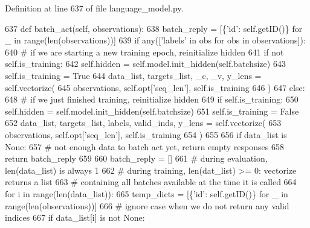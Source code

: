 Definition at line 637 of file language\+\_\+model.\+py.


\begin{DoxyCode}
637     \textcolor{keyword}{def }batch\_act(self, observations):
638         batch\_reply = [\{\textcolor{stringliteral}{'id'}: self.getID()\} \textcolor{keywordflow}{for} \_ \textcolor{keywordflow}{in} range(len(observations))]
639         \textcolor{keywordflow}{if} any([\textcolor{stringliteral}{'labels'} \textcolor{keywordflow}{in} obs \textcolor{keywordflow}{for} obs \textcolor{keywordflow}{in} observations]):
640             \textcolor{comment}{# if we are starting a new training epoch, reinitialize hidden}
641             \textcolor{keywordflow}{if} \textcolor{keywordflow}{not} self.is\_training:
642                 self.hidden = self.model.init\_hidden(self.batchsize)
643             self.is\_training = \textcolor{keyword}{True}
644             data\_list, targets\_list, \_c, \_v, y\_lens = self.vectorize(
645                 observations, self.opt[\textcolor{stringliteral}{'seq\_len'}], self.is\_training
646             )
647         \textcolor{keywordflow}{else}:
648             \textcolor{comment}{# if we just finished training, reinitialize hidden}
649             \textcolor{keywordflow}{if} self.is\_training:
650                 self.hidden = self.model.init\_hidden(self.batchsize)
651                 self.is\_training = \textcolor{keyword}{False}
652             data\_list, targets\_list, labels, valid\_inds, y\_lens = self.vectorize(
653                 observations, self.opt[\textcolor{stringliteral}{'seq\_len'}], self.is\_training
654             )
655 
656         \textcolor{keywordflow}{if} data\_list \textcolor{keywordflow}{is} \textcolor{keywordtype}{None}:
657             \textcolor{comment}{# not enough data to batch act yet, return empty responses}
658             \textcolor{keywordflow}{return} batch\_reply
659 
660         batch\_reply = []
661         \textcolor{comment}{# during evaluation, len(data\_list) is always 1}
662         \textcolor{comment}{# during training, len(dat\_list) >= 0: vectorize returns a list}
663         \textcolor{comment}{#     containing all batches available at the time it is called}
664         \textcolor{keywordflow}{for} i \textcolor{keywordflow}{in} range(len(data\_list)):
665             temp\_dicts = [\{\textcolor{stringliteral}{'id'}: self.getID()\} \textcolor{keywordflow}{for} \_ \textcolor{keywordflow}{in} range(len(observations))]
666             \textcolor{comment}{# ignore case when we do not return any valid indices}
667             \textcolor{keywordflow}{if} data\_list[i] \textcolor{keywordflow}{is} \textcolor{keywordflow}{not} \textcolor{keywordtype}{None}:

\end{DoxyCode}
